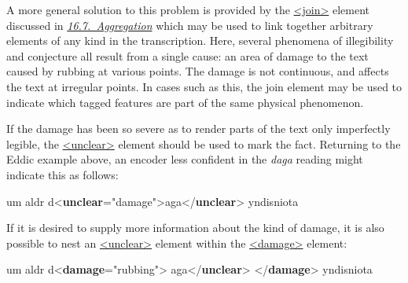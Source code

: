 A more general solution to this problem is provided by the \hyperref[TEI.join]{<join>} element discussed in \textit{\hyperref[SAAG]{16.7.\ Aggregation}} which may be used to link together arbitrary elements of any kind in the transcription. Here, several phenomena of illegibility and conjecture all result from a single cause: an area of damage to the text caused by rubbing at various points. The damage is not continuous, and affects the text at irregular points. In cases such as this, the join element may be used to indicate which tagged features are part of the same physical phenomenon.\par
If the damage has been so severe as to render parts of the text only imperfectly legible, the \hyperref[TEI.unclear]{<unclear>} element should be used to mark the fact. Returning to the Eddic example above, an encoder less confident in the \textit{daga} reading might indicate this as follows: \par\bgroup{}\exampleFont \begin{shaded}\noindent\mbox{}um aldr d{<\textbf{unclear}\hspace*{1em}{reason}="{damage}">}aga{</\textbf{unclear}>} yndisniota\end{shaded}\egroup\par \par
If it is desired to supply more information about the kind of damage, it is also possible to nest an \hyperref[TEI.unclear]{<unclear>} element within the \hyperref[TEI.damage]{<damage>} element: \par\bgroup{}\exampleFont \begin{shaded}\noindent\mbox{}um aldr d{<\textbf{damage}\hspace*{1em}{agent}="{rubbing}">}\mbox{}\newline 
{}aga{</\textbf{unclear}>}\mbox{}\newline 
{</\textbf{damage}>} yndisniota\end{shaded}\egroup\par \par
